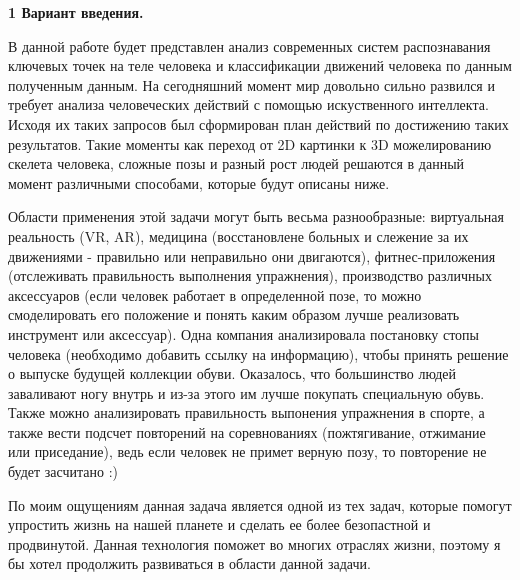 \hfill \break
\textbf{\Large 1 Вариант введения.}

В данной работе будет представлен анализ современных систем распознавания ключевых точек на теле человека и классификации движений человека по данным полученным данным. На сегодняшний момент мир довольно сильно развился и требует анализа человеческих действий с помощью искуственного интеллекта. Исходя их таких запросов был сформирован план действий по достижению таких результатов. Такие моменты как переход от 2D картинки  к 3D можелированию скелета человека, сложные позы и разный рост людей решаются в данный момент различными способами, которые будут описаны ниже.

Области применения этой задачи могут быть весьма разнообразные: виртуальная реальность (VR, AR), медицина (восстановлене больных и слежение за их движениями - правильно или неправильно они двигаются), фитнес-приложения (отслеживать правильность выполнения упражнения), производство различных аксессуаров (если человек работает в определенной позе, то можно смоделировать его положение и понять каким образом лучше реализовать инструмент или аксессуар). Одна компания анализировала постановку стопы человека (необходимо добавить ссылку на информацию), чтобы принять решение о выпуске будущей коллекции обуви. Оказалось, что большинство людей заваливают ногу внутрь и из-за этого им лучше покупать специальную обувь. Также можно анализировать правильность выпонения упражнения в спорте, а также вести подсчет повторений на соревнованиях (пожтягивание, отжимание или приседание), ведь если человек не примет верную позу, то повторение не будет засчитано :)

По моим ощущениям данная задача является одной из тех задач, которые помогут упростить жизнь на нашей планете и сделать ее более безопастной и продвинутой. Данная технология поможет во многих отраслях жизни, поэтому я бы хотел продолжить развиваться в области данной задачи.


\newpage